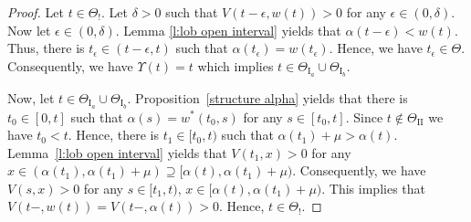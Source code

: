 \documentclass[11pt]{scrartcl}
\newcommand{\lasttrade}{\Upsilon}
\begin{document}
\begin{proof}
 Let $t\in\Theta_!$. Let $\delta>0$ such that $V(t-\epsilon,w(t))>0$ for any $\epsilon\in(0,\delta)$. 
 Now let $\epsilon\in(0,\delta)$. Lemma \ref{l:lob open interval} yields that $\alpha(t-\epsilon) < w(t)$. 
 Thus, there is $t_\epsilon\in (t-\epsilon,t)$ such that $\alpha(t_\epsilon)=w(t_\epsilon)$. Hence, 
 we have $t_\epsilon\in\Theta$. Consequently, we have $\lasttrade(t) = t$ which 
 implies $t\in \Theta_{\mathrm{I}_a} \cup \Theta_{\mathrm{I}_b}$.
 
 Now, let $t\in \Theta_{\mathrm{I}_a} \cup \Theta_{\mathrm{I}_b}$. 
 Proposition~\ref{structure alpha} yields that there is $t_0\in[0,t]$ such 
 that $\alpha(s)=w^*(t_0,s)$ for any $s\in[t_0,t]$. Since $t\notin\Theta_{\mathrm{II}}$ we 
 have $t_0<t$. Hence, there is $t_1\in[t_0,t)$ such that $\alpha(t_1)+\mu > \alpha(t)$. 
 Lemma~\ref{l:lob open interval} yields that $V(t_1,x) > 0$ for 
 any $x\in (\alpha(t_1),\alpha(t_1)+\mu)\supseteq [\alpha(t),\alpha(t_1)+\mu)$. 
 Consequently, we have $V(s,x)>0$ for any $s\in [t_1,t)$, $x\in [\alpha(t),\alpha(t_1)+\mu)$. 
 This implies that $V(t-,w(t)) = V(t-,\alpha(t)) > 0$. Hence, $t\in\Theta_!$.
\end{proof}
\end{document}
